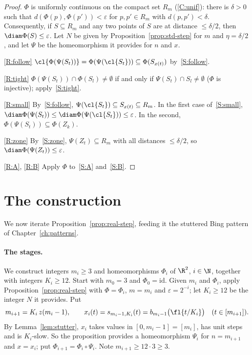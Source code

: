 \begin{proof}
$\Phi$ is uniformly continuous on the compact set $R_m$ (\ref{C:unif}): there is $\delta>0$ such
that $d(\Phi(p),\Phi(p'))<\varepsilon$ for $p,p'\in R_m$ with $d(p,p')<\delta$. Consequently, if
$S\subseteq R_m$ and any two points of $S$ are at distance $\le\delta/2$, then
$\diam\Phi(S)\le\varepsilon$. Let $N$ be given by Proposition~\ref{prop:std-step} for $m$ and
$\eta=\delta/2$, and let $\Psi$ be the homeomorphism it provides for $n$ and $x$.

\ref{R:follow} $\cl{\Phi(\Psi(S_t))}=\Phi(\Psi(\cl{S_t}))\subseteq\Phi(S_{x(t)})$ by~\ref{S:follow}.

\ref{R:tight} $\Phi(\Psi(S_t))\cap\Phi(S_l)\neq\emptyset$ if and only if $\Psi(S_t)\cap S_l\neq\emptyset$
($\Phi$ is injective); apply~\ref{S:tight}.

\ref{R:small} By~\ref{S:follow}, $\Psi(\cl{S_t})\subseteq S_{x(t)}\subseteq R_m$. In the first case
of~\ref{S:small}, $\diam\Phi(\Psi(S_t))\le\diam\Phi(\Psi(\cl{S_t}))\le\varepsilon$. In the second,
$\Phi(\Psi(S_t))\subseteq\Phi(Z_k)$.

\ref{R:zone} By~\ref{S:zone}, $\Psi(Z_t)\subseteq R_m$ with all distances $\le\delta/2$, so
$\diam\Phi(\Psi(Z_t))\le\varepsilon$.

\ref{R:A}, \ref{R:B} Apply $\Phi$ to~\ref{S:A} and~\ref{S:B}.
\end{proof}


\section{The construction}

We now iterate Proposition~\ref{prop:real-step}, feeding it the stuttered Bing pattern of
Chapter~\ref{ch:patterns}.

\paragraph{The stages.} We construct integers $m_i\ge3$ and homeomorphisms $\Phi_i$ of $\R^2$,
$i\in\N$, together with integers $K_i\ge12$. Start with $m_0=3$ and $\Phi_0=\mathrm{id}$. Given $m_i$
and $\Phi_i$, apply Proposition~\ref{prop:real-step} with $\Phi=\Phi_i$, $m=m_i$ and
$\varepsilon=2^{-i}$; let $K_i\ge12$ be the integer $N$ it provides. Put
\[
m_{i+1}=K_i\,z(m_i-1),\qquad x_i(t)=s_{m_i-1,K_i}(t)=b_{m_i-1}\big(\fl{t/K_i}\big)\quad(t\in[m_{i+1}]).
\]
By Lemma~\ref{lem:stutter}, $x_i$ takes values in $[0,m_i-1]=[m_i]$, has unit steps and is
$K_i$-slow. So the proposition provides a homeomorphism $\Psi_i$ for $n=m_{i+1}$ and $x=x_i$; put
$\Phi_{i+1}=\Phi_i\circ\Psi_i$. Note $m_{i+1}\ge12\cdot3\ge3$.

